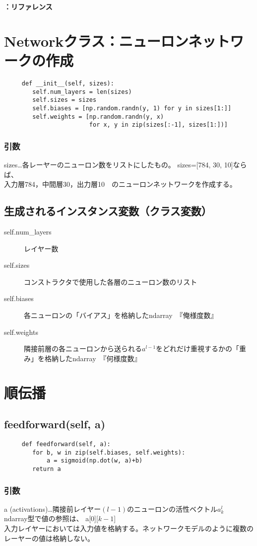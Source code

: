 \documentclass[11pt,a4j,fleqn]{jarticle}
\newcounter{apart}
\begin{document}
\newpage
\textbf{\Large \theapart ：リファレンス}

\section{Networkクラス：ニューロンネットワークの作成}
\begin{verbatim}
     def __init__(self, sizes):
        self.num_layers = len(sizes)
        self.sizes = sizes
        self.biases = [np.random.randn(y, 1) for y in sizes[1:]]
        self.weights = [np.random.randn(y, x)
                        for x, y in zip(sizes[:-1], sizes[1:])]
\end{verbatim}
\subsubsection{引数}
  sizes…各レーヤーのニューロン数をリストにしたもの。 sizes=[784, 30, 10]ならば、\\
  入力層784，中間層30，出力層10　のニューロンネットワークを作成する。
\subsection{生成されるインスタンス変数（クラス変数）}
\begin{description}
  \item [self.num\_layers] レイヤー数
  \item[self.sizes] コンストラクタで使用した各層のニューロン数のリスト
  \item[self.biases] 各ニューロンの「バイアス」を格納したndarray　『俺様度数』
  \item[self.weights]隣接前層の各ニューロンから送られる$a^{l-1}$をどれだけ重視するかの「重み」を格納したndarray　『何様度数』
\end{description}

\section{順伝播}
\subsection{feedforward(self, a)}
\begin{verbatim}
     def feedforward(self, a):
        for b, w in zip(self.biases, self.weights):
            a = sigmoid(np.dot(w, a)+b)
        return a
\end{verbatim}
\subsubsection{引数 }
a (activations)…隣接前レイヤー$(l-1)$のニューロンの活性ベクトル$a^l_{k}$\\
ndarray型で値の参照は、 a[0][$k-1$]\\
入力レイヤーにおいては入力値を格納する。ネットワークモデルのように複数のレーヤーの値は格納しない。
\end{document}
